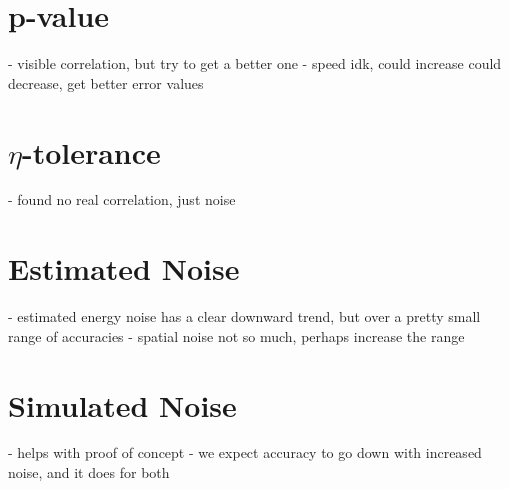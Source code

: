 \section{p-value}
- visible correlation, but try to get a better one
- speed idk, could increase could decrease, get better error values

\section{$\eta$-tolerance}
- found no real correlation, just noise

\section{Estimated Noise}
- estimated energy noise has a clear downward trend, but over a pretty small range of accuracies
- spatial noise not so much, perhaps increase the range

\section{Simulated Noise}
- helps with proof of concept
- we expect accuracy to go down with increased noise, and it does for both